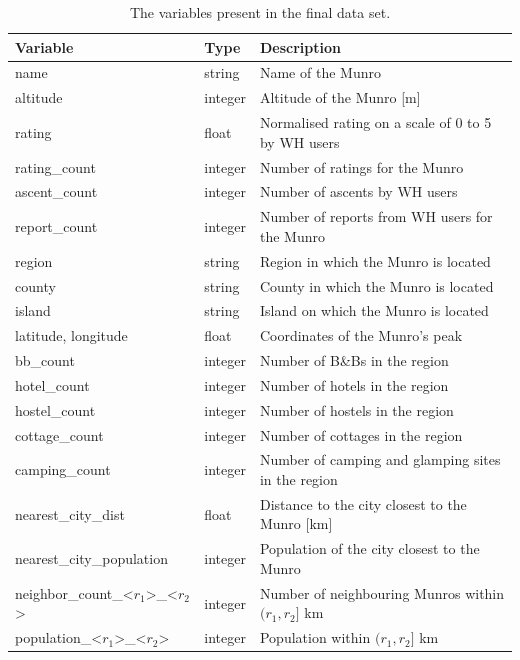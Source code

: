\documentclass[11pt,a4paper]{article}
\begin{document}
\begin{table}
    \centering
    \begin{tabular}{l  l  l} 
        \toprule
        Variable & Type & Description  \\ 
        \midrule
        name & string & Name of the Munro \\ 
        altitude & integer & Altitude of the Munro [m] \\
        \hline
        rating & float & Normalised rating on a scale of 0 to 5 by WH users\\
        rating\_count & integer & Number of ratings for the Munro \\
        ascent\_count & integer & Number of ascents by WH users\\
        report\_count & integer & Number of reports from WH users for the Munro\\
        \hline
        region & string & Region in which the Munro is located \\
        county & string & County in which the Munro is located\\
        island & string & Island on which the Munro is located\\
        latitude, longitude & float & Coordinates of the Munro's peak\\
        \hline
        bb\_count & integer & Number of B\&Bs in the region\\
        hotel\_count & integer & Number of hotels in the region\\
        hostel\_count & integer & Number of hostels in the region\\
        cottage\_count & integer & Number of cottages in the region\\
        camping\_count & integer & Number of camping and glamping sites in the region\\
        \hline
        nearest\_city\_dist & float & Distance to the city closest to the Munro [km]\\
        nearest\_city\_population & integer & Population of the city closest to the Munro\\
        neighbor\_count\_<$r_1$>\_<$r_2$> & integer & Number of neighbouring Munros within $(r_1,r_2]$ km\\
        population\_<$r_1$>\_<$r_2$> & integer & Population within $(r_1,r_2]$ km\\
        \bottomrule
    \end{tabular}
    \caption{The variables present in the final data set.}
    \label{table:1}
\end{table}
\end{document}
